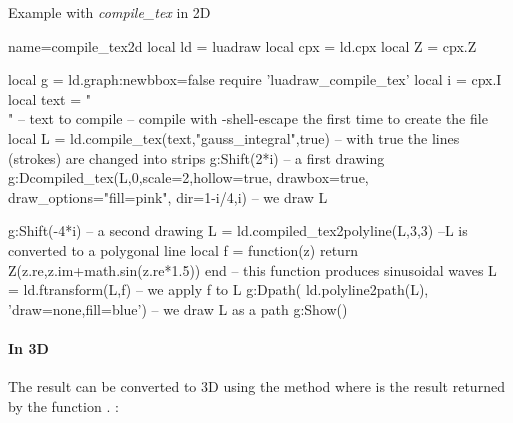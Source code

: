 \begin{demo}{Example with \emph{compile\_tex} in 2D}
\begin{luadraw}{name=compile_tex2d}
local ld = luadraw
local cpx = ld.cpx
local Z = cpx.Z

local g = ld.graph:new{bbox=false}
require 'luadraw_compile_tex'
local i = cpx.I
local text = "\\[\\int_0^{+\\infty} e^{-\\frac{x^2}2}dx = \\frac{\\sqrt{2\\pi}}2\\]" -- text to compile
-- compile with -shell-escape the first time to create the file
local L = ld.compile_tex(text,"gauss_integral",true) -- with true the lines (strokes) are changed into strips
g:Shift(2*i) -- a first drawing
g:Dcompiled_tex(L,0,{scale=2,hollow=true, drawbox=true, draw_options="fill=pink", dir={1-i/4,i}}) -- we draw L

g:Shift(-4*i) -- a second drawing
L = ld.compiled_tex2polyline(L,{3,3}) --L is converted to a polygonal line
local f = function(z) return Z(z.re,z.im+math.sin(z.re*1.5)) end  -- this function produces sinusoidal waves
L = ld.ftransform(L,f) -- we apply f to L
g:Dpath( ld.polyline2path(L), 'draw=none,fill=blue') -- we draw L as a path
g:Show()
\end{luadraw}
\end{demo}


\paragraph{In 3D} The result can be converted to 3D using the method  where  is the result returned by the function . \writeoptions:

